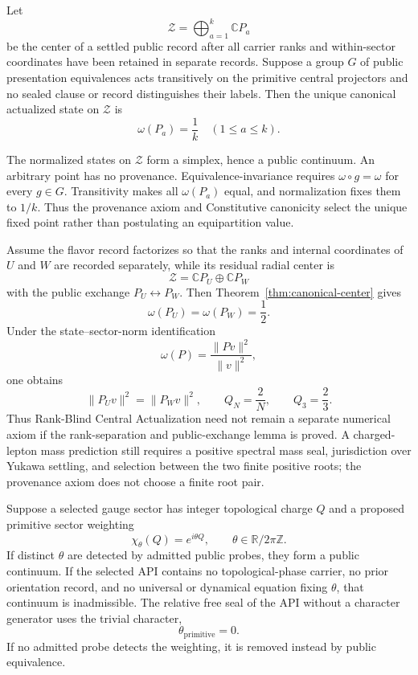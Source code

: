 \begin{theorem}
\label{thm:canonical-center}
Let
\[
 \mathcal Z=\bigoplus_{a=1}^k\mathbb C P_a
\]
be the center of a settled public record after all carrier ranks and within-sector
coordinates have been retained in separate records.  Suppose a group \(G\) of public
presentation equivalences acts transitively on the primitive central projectors and
no sealed clause or record distinguishes their labels.  Then the unique canonical
actualized state on \(\mathcal Z\) is
\[
 \boxed{\omega(P_a)=\frac1k\quad(1\le a\le k)}.
\]
\end{theorem}

\begin{proofsketch}
The normalized states on \(\mathcal Z\) form a simplex, hence a public continuum.
An arbitrary point has no provenance.  Equivalence-invariance requires
\(\omega\circ g=\omega\) for every \(g\in G\).  Transitivity makes all
\(\omega(P_a)\) equal, and normalization fixes them to \(1/k\).  Thus the
provenance axiom and Constitutive canonicity select the unique fixed point rather than
postulating an equipartition value.
\end{proofsketch}

\begin{corollary}
\label{cor:koide-provenance}
Assume the flavor record factorizes so that the ranks and internal coordinates of
\(U\) and \(W\) are recorded separately, while its residual radial center is
\[
 \mathcal Z=\mathbb C P_U\oplus\mathbb C P_W
\]
with the public exchange \(P_U\leftrightarrow P_W\).  Then
Theorem~\ref{thm:canonical-center} gives
\[
 \omega(P_U)=\omega(P_W)=\frac12.
\]
Under the state--sector-norm identification
\[
 \omega(P)=\frac{\|Pv\|^2}{\|v\|^2},
\]
one obtains
\[
 \|P_Uv\|^2=\|P_Wv\|^2,
 \qquad
 \boxed{Q_N=\frac2N},
 \qquad
 \boxed{Q_3=\frac23}.
\]
Thus Rank-Blind Central Actualization need not remain a separate numerical axiom if
the rank-separation and public-exchange lemma is proved.  A charged-lepton mass
prediction still requires a positive spectral mass seal, jurisdiction over Yukawa
settling, and selection between the two finite positive roots; the provenance axiom
does not choose a finite root pair.
\end{corollary}

\begin{proposition}
\label{prop:theta-exclusion}
Suppose a selected gauge sector has integer topological charge \(Q\) and a proposed
primitive sector weighting
\[
 \chi_\theta(Q)=e^{i\theta Q},
 \qquad \theta\in\mathbb R/2\pi\mathbb Z.
\]
If distinct \(\theta\) are detected by admitted public probes, they form a public
continuum.  If the selected API contains no topological-phase carrier, no prior
orientation record, and no universal or dynamical equation fixing \(\theta\), that
continuum is inadmissible.  The relative free seal of the API without a character
generator uses the trivial character,
\[
 \boxed{\theta_{\mathrm{primitive}}=0}.
\]
If no admitted probe detects the weighting, it is removed instead by public
equivalence.
\end{proposition}

